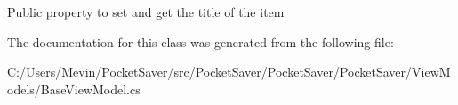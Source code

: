 Public property to set and get the title of the item 



The documentation for this class was generated from the following file\+:\begin{DoxyCompactItemize}
\item 
C\+:/\+Users/\+Mevin/\+Pocket\+Saver/src/\+Pocket\+Saver/\+Pocket\+Saver/\+Pocket\+Saver/\+View\+Models/Base\+View\+Model.\+cs\end{DoxyCompactItemize}
